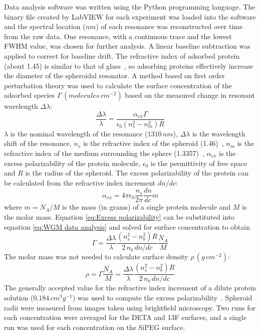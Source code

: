 Data analysis software was written using the Python programming language.
The binary file created by LabVIEW for each experiment was loaded
into the software and the spectral location ($nm$) of each resonance
was reconstructed over time from the raw data. One resonance, with
a continuous trace and the lowest FWHM value, was chosen for further
analysis. A linear baseline subtraction was applied to correct for
baseline drift. The refractive index of adsorbed protein (about 1.45)
is similar to that of glass~\cite{Akimoto1999}, so adsorbing proteins
effectively increase the diameter of the spheroidal resonator. A method
based on first order perturbation theory \cite{Vollmer2002,Arnold2003}
was used to calculate the surface concentration of the adsorbed species
$\Gamma\,\left(molecules\, cm^{-2}\right)$ based on the measured
change in resonant wavelength $\Delta\lambda$:\begin{equation}
\frac{\Delta\lambda}{\lambda}=\frac{\alpha_{ex}\Gamma}{\epsilon_{0}\left(n_{s}^{2}-n_{m}^{2}\right)R}\label{eq:WGM data analysis}\end{equation}
$\lambda$ is the nominal wavelength of the resonance ($1310\, nm$),
$\Delta\lambda$ is the wavelength shift of the resonance, $n_{s}$
is the refractive index of the spheroid (1.46)~\cite{SMF28e}, $n_{m}$
is the refractive index of the medium surrounding the sphere (1.3357)~\cite{Akimoto1999},
$\alpha_{ex}$ is the excess polarizability of the protein molecule,
$\epsilon_{0}$ is the permittivity of free space and $R$ is the
radius of the spheroid. The excess polarizability of the protein can
be calculated from the refractive index increment $dn/dc$:\begin{equation}
\alpha_{ex}=4\pi\epsilon_{0}\frac{n_{s}}{2\pi}\frac{dn}{dc}m\label{eq:Excess polarizability}\end{equation}
where $m=N_{A}/M$ is the mass (in grams) of a single protein molecule
and $M$ is the molar mass. Equation \ref{eq:Excess polarizability}
can be substituted into equation \ref{eq:WGM data analysis} and solved
for surface concentration to obtain\begin{equation}
\Gamma=\frac{\Delta\lambda}{\lambda}\frac{\left(n_{s}^{2}-n_{b}^{2}\right)R}{2\, n_{b}\, dn/dc}\frac{N_{A}}{M}\label{eq:WGM data analysis 2}\end{equation}
The molar mass was not needed to calculate surface density $\rho\,\left(g\, cm^{-2}\right)$:
\begin{equation}
\rho=\Gamma\frac{N_{A}}{M}=\frac{\Delta\lambda}{\lambda}\frac{\left(n_{s}^{2}-n_{b}^{2}\right)R}{2\, n_{b}\, dn/dc}\label{eq:WGM data analysis 3}\end{equation}
The generally accepted value for the refractive index increment of
a dilute protein solution ($0.184\, cm^{3}g^{-1}$) was used to compute
the excess polarizability~\cite{Vollmer2002,Voros2004}. Spheroid
radii were measured from images taken using brightfield microscopy.
Two runs for each concentration were averaged for the DETA and 13F
surfaces, and a single run was used for each concentration on the
SiPEG surface.


